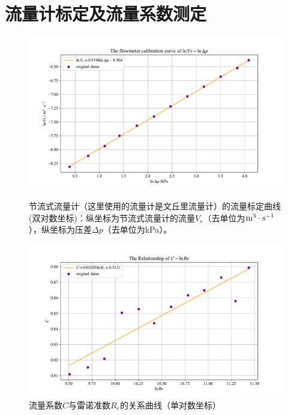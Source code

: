 \documentclass[UTF8,AutoFakeBold,a4paper]{article}
\begin{document}
	\section{流量计标定及流量系数测定}
\begin{figure}[h]
	\centering
	\includegraphics[scale=0.6]{文丘里1}
	\caption{节流式流量计（这里使用的流量计是文丘里流量计）的流量标定曲线(双对数坐标)：纵坐标为节流式流量计的流量$V_{s}$（去单位为$\rm{m}^{3}\cdot\rm{s}^{-1}$），纵坐标为压差$\Delta p$（去单位为kPa）。}
	\label{fi1}
	
	\centering
	\includegraphics[scale=0.6]{文丘里2.pdf}
	\caption{流量系数$C$与雷诺准数$R_{e}$的关系曲线（单对数坐标）}
	\label{fi2}
\end{figure}
\end{document}
